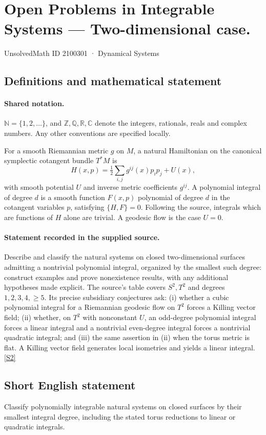 \documentclass[11pt]{article}
\newcommand{\sref}[2]{\hyperlink{source:#1:#2}{[S#2]}}
\begin{document}
\setcounter{section}{2100300}
\section{Open Problems in Integrable Systems — Two-dimensional case.}\label{2100301}
{\small\sffamily UnsolvedMath ID 2100301 · Dynamical Systems}
\subsection{Definitions and mathematical statement}

\paragraph{Shared notation.}$\mathbb N=\{1,2,\ldots\}$, and $\mathbb Z,\mathbb Q,\mathbb R,\mathbb C$ denote the integers, rationals, reals and complex numbers. Any other conventions are specified locally.


For a smooth Riemannian metric $g$ on $M$, a natural Hamiltonian on the canonical symplectic cotangent bundle $T^*M$ is \[H(x,p)=\tfrac12\sum_{i,j}g^{ij}(x)p_ip_j+U(x),\] with smooth potential $U$ and inverse metric coefficients $g^{ij}$. A polynomial integral of degree $d$ is a smooth function $F(x,p)$ polynomial of degree $d$ in the cotangent variables $p$, satisfying $\{H,F\}=0$. Following the source, integrals which are functions of $H$ alone are trivial. A geodesic flow is the case $U=0$.
\paragraph{Statement recorded in the supplied source.}
Describe and classify the natural systems on closed two-dimensional surfaces admitting a nontrivial polynomial integral, organized by the smallest such degree: construct examples and prove nonexistence results, with any additional hypotheses made explicit. The source's table covers $S^2,T^2$ and degrees $1,2,3,4,\ge5$. Its precise subsidiary conjectures ask: (i) whether a cubic polynomial integral for a Riemannian geodesic flow on $T^2$ forces a Killing vector field; (ii) whether, on $T^2$ with nonconstant $U$, an odd-degree polynomial integral forces a linear integral and a nontrivial even-degree integral forces a nontrivial quadratic integral; and (iii) the same assertion in (ii) when the torus metric is flat. A Killing vector field generates local isometries and yields a linear integral. \sref{2100301}{2}
\subsection{Short English statement}
Classify polynomially integrable natural systems on closed surfaces by their smallest integral degree, including the stated torus reductions to linear or quadratic integrals.
\end{document}
